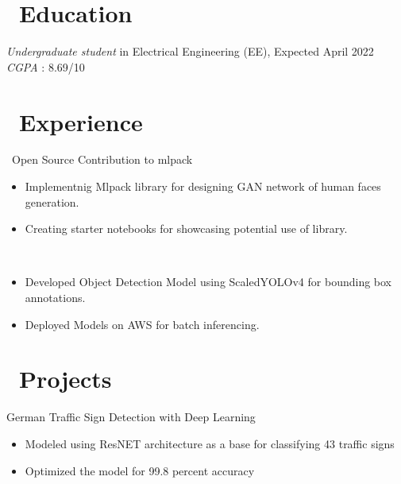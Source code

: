\documentclass{resume}
\begin{document}



\section{\faGraduationCap\ Education}
\textit{Undergraduate student} in Electrical Engineering (EE), Expected April 2022 \\
\textit {CGPA} : 8.69/10

\section{\faUsers\ Experience}
\role{Student Developer} 
\ Open Source Contribution to mlpack
\begin{itemize}
  \item Implementnig Mlpack library for designing GAN network of human faces generation. 
  \item Creating starter notebooks for showcasing potential use of library. 
\end{itemize}

\
\begin{itemize}
  \item Developed Object Detection Model using ScaledYOLOv4 for bounding box annotations.
  \item Deployed Models on AWS for batch inferencing.
\end{itemize}

\section{\faGraduationCap\ Projects}
German Traffic Sign Detection with Deep Learning
\begin{itemize}
  \item Modeled using ResNET architecture as a base for classifying 43 traffic signs
  \item Optimized the model for 99.8 percent accuracy
\end{itemize}
\end{document}
